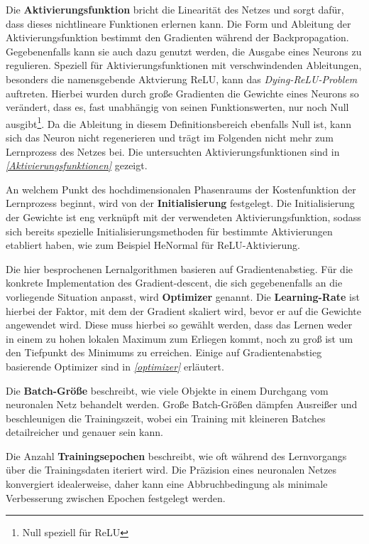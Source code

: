 Die \textbf{Aktivierungsfunktion} bricht die Linearität des Netzes und sorgt dafür, dass dieses nichtlineare Funktionen erlernen kann.  Die Form und Ableitung der Aktivierungsfunktion bestimmt den Gradienten während der Backpropagation. Gegebenenfalls kann sie auch dazu genutzt werden, die Ausgabe eines Neurons zu regulieren. Speziell für Aktivierungsfunktionen mit verschwindenden Ableitungen, besonders die namensgebende Aktvierung ReLU\cite{ReLU}, kann das \textit{Dying-ReLU-Problem} auftreten. Hierbei wurden durch große Gradienten die Gewichte eines Neurons so verändert, dass es, fast unabhängig von seinen Funktionswerten, nur noch Null ausgibt\footnote{Null speziell für ReLU}. Da die Ableitung in diesem Definitionsbereich ebenfalls Null ist, kann sich das Neuron nicht regenerieren und trägt im Folgenden nicht mehr zum Lernprozess des Netzes bei. Die untersuchten Aktivierungsfunktionen sind in \textit{\autoref{Aktivierungsfunktionen}} gezeigt.

An welchem Punkt des hochdimensionalen Phasenraums der Kostenfunktion der Lernprozess beginnt, wird von der \textbf{Initialisierung} festgelegt. Die Initialisierung der Gewichte ist eng verknüpft mit der verwendeten Aktivierungsfunktion, sodass sich bereits spezielle Initialisierungsmethoden für bestimmte Aktivierungen etabliert haben, wie zum Beispiel HeNormal für ReLU-Aktivierung. %

Die hier besprochenen Lernalgorithmen basieren auf Gradientenabstieg. Für die konkrete Implementation des Gradient-descent, die sich gegebenenfalls an die vorliegende Situation anpasst, wird \textbf{Optimizer} genannt. Die \textbf{Learning-Rate} ist hierbei der Faktor, mit dem der Gradient skaliert wird, bevor er auf die Gewichte angewendet wird. Diese muss hierbei so gewählt werden, dass das Lernen weder in einem zu hohen lokalen Maximum zum Erliegen kommt, noch zu groß ist um den Tiefpunkt des Minimums zu erreichen. Einige auf Gradientenabstieg basierende Optimizer sind in \textit{\autoref{optimizer}} erläutert.

Die \textbf{Batch-Größe} beschreibt, wie viele Objekte in einem Durchgang vom neuronalen Netz behandelt werden. Große Batch-Größen dämpfen Ausreißer und beschleunigen die Trainingszeit, wobei ein Training mit kleineren Batches detailreicher und genauer sein kann. 

Die Anzahl \textbf{Trainingsepochen} beschreibt, wie oft während des Lernvorgangs über die Trainingsdaten iteriert wird. Die Präzision eines neuronalen Netzes konvergiert idealerweise, daher kann eine Abbruchbedingung als minimale Verbesserung zwischen Epochen festgelegt werden. 

